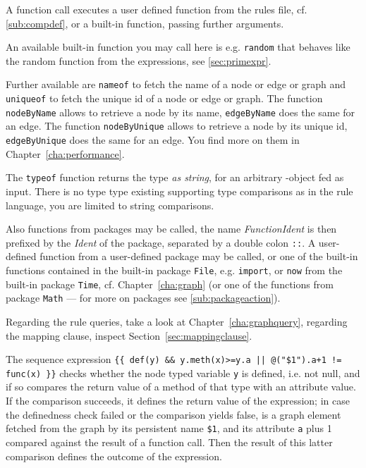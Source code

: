 A function call executes a user defined function from the rules file, cf. \ref{sub:compdef},
or a built-in function, passing further arguments.

An available built-in function you may call here is e.g. \texttt{random} that behaves like the random function from the expressions, see \ref{sec:primexpr}.

Further available are \texttt{nameof} to fetch the name of a node or edge or graph and \texttt{uniqueof} to fetch the unique id of a node or edge or graph.
The function \texttt{nodeByName} allows to retrieve a node by its name, \texttt{edgeByName} does the same for an edge.
The function \texttt{nodeByUnique} allows to retrieve a node by its unique id, \texttt{edgeByUnique} does the same for an edge.
You find more on them in Chapter~\ref{cha:performance}.

The \texttt{typeof} function returns the type \emph{as string}, for an arbitrary \GrG-object fed as input.
There is no type type existing supporting type comparisons as in the rule language, you are limited to string comparisons.

Also functions from packages may be called, the name \emph{FunctionIdent} is then prefixed by the \emph{Ident} of the package, separated by a double colon \texttt{::}.
A user-defined function from a user-defined package may be called, or one of the built-in functions contained in the built-in package \texttt{File}, e.g. \texttt{import}, or \texttt{now} from the built-in package \texttt{Time}, cf. Chapter~\ref{cha:graph} (or one of the functions from package \texttt{Math} --- for more on packages see \ref{sub:packageaction}).

Regarding the rule queries, take a look at Chapter~\ref{cha:graphquery}, regarding the mapping clause, inspect Section~\ref{sec:mappingclause}.

\begin{example}
The sequence expression \verb#{{ def(y) && y.meth(x)>=y.a || @("$1").a+1 != func(x) }}# checks whether the node typed variable \texttt{y} is defined, i.e. not null, and if so compares the return value of a method of that type with an attribute value. If the comparison succeeds, it defines the return value of the expression; in case the definedness check failed or the comparison yields false, is a graph element fetched from the graph by its persistent name \verb#$1#, and its attribute \texttt{a} plus 1 compared against the result of a function call. Then the result of this latter comparison defines the outcome of the expression.
\end{example}


